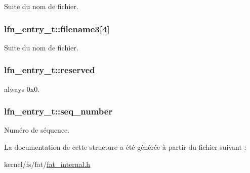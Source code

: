 \-Suite du nom de fichier. \hypertarget{structlfn__entry__t_aa157718941579c9ef9bb5eba85015ec0}{
\subsubsection[{filename3}]{ {\bf lfn\-\_\-entry\-\_\-t\-::filename3}\mbox{[}4\mbox{]}}}\label{structlfn__entry__t_aa157718941579c9ef9bb5eba85015ec0}
\-Suite du nom de fichier. \hypertarget{structlfn__entry__t_a506f9cbd0e4fe209626eedaf48c1f8bf}{
\subsubsection[{reserved}]{ {\bf lfn\-\_\-entry\-\_\-t\-::reserved}}}\label{structlfn__entry__t_a506f9cbd0e4fe209626eedaf48c1f8bf}
always 0x0. \hypertarget{structlfn__entry__t_a07b88226674917555309538459b194df}{
\subsubsection[{seq\-\_\-number}]{ {\bf lfn\-\_\-entry\-\_\-t\-::seq\-\_\-number}}}\label{structlfn__entry__t_a07b88226674917555309538459b194df}
\-Numéro de séquence. 

\-La documentation de cette structure a été générée à partir du fichier suivant \-:\begin{DoxyCompactItemize}
\item 
kernel/fs/fat/\hyperlink{fat__internal_8h}{fat\-\_\-internal.\-h}\end{DoxyCompactItemize}

